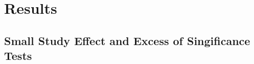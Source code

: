 \documentclass[11pt,a4paper,twoside]{book}\usepackage[]{graphicx}\usepackage[]{color}
\begin{document}





































\chapter{Results} \label{ch:Results}


\section{Small Study Effect and Excess of Singificance Tests}
\end{document}
